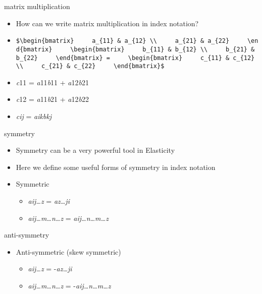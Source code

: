 \documentclass[
  letterpaper,
  ignorenonframetext,
  aspectratio=43,
  handout,
  12pt]{beamer}
\providecommand{\tightlist}{%
  \setlength{\itemsep}{0pt}\setlength{\parskip}{0pt}}
\providecommand{\tightlist}{%
\setlength{\itemsep}{0pt}\setlength{\parskip}{0pt}}
\begin{document}
\begin{frame}[fragile]{matrix multiplication}
\protect\hypertarget{matrix-multiplication}{}
\begin{itemize}
\item
  How can we write matrix multiplication in index notation?
\item
  \texttt{\$\textbackslash{}begin\{bmatrix\}\ \ \ \ \ a\_\{11\}\ \&\ a\_\{12\}\ \textbackslash{}\textbackslash{}\ \ \ \ \ a\_\{21\}\ \&\ a\_\{22\}\ \ \ \ \ \textbackslash{}end\{bmatrix\}\ \ \ \ \ \textbackslash{}begin\{bmatrix\}\ \ \ \ \ b\_\{11\}\ \&\ b\_\{12\}\ \textbackslash{}\textbackslash{}\ \ \ \ \ b\_\{21\}\ \&\ b\_\{22\}\ \ \ \ \ \textbackslash{}end\{bmatrix\}\ =\ \ \ \ \ \textbackslash{}begin\{bmatrix\}\ \ \ \ \ c\_\{11\}\ \&\ c\_\{12\}\ \textbackslash{}\textbackslash{}\ \ \ \ \ c\_\{21\}\ \&\ c\_\{22\}\ \ \ \ \ \textbackslash{}end\{bmatrix\}\$}
\item
  \emph{c}11 = \emph{a}11\emph{b}11 + \emph{a}12\emph{b}21
\item
  \emph{c}12 = \emph{a}11\emph{b}21 + \emph{a}12\emph{b}22
\item
  \emph{c}\emph{ij} = \emph{a}\emph{ik}\emph{b}\emph{kj}
\end{itemize}
\end{frame}

\begin{frame}{symmetry}
\protect\hypertarget{symmetry}{}
\begin{itemize}
\tightlist
\item
  Symmetry can be a very powerful tool in Elasticity
\item
  Here we define some useful forms of symmetry in index notation
\item
  Symmetric

  \begin{itemize}
  \tightlist
  \item
    \emph{a}\emph{ij\ldots z} = \emph{a}\emph{z\ldots ji}
  \item
    \emph{a}\emph{ij\ldots m\ldots n\ldots z} =
    \emph{a}\emph{ij\ldots n\ldots m\ldots z}
  \end{itemize}
\end{itemize}
\end{frame}

\begin{frame}{anti-symmetry}
\protect\hypertarget{anti-symmetry}{}
\begin{itemize}
\tightlist
\item
  Anti-symmetric (skew symmetric)

  \begin{itemize}
  \tightlist
  \item
    \emph{a}\emph{ij\ldots z} = -\emph{a}\emph{z\ldots ji}
  \item
    \emph{a}\emph{ij\ldots m\ldots n\ldots z} =
    -\emph{a}\emph{ij\ldots n\ldots m\ldots z}
  \end{itemize}
\end{itemize}
\end{frame}
\end{document}
